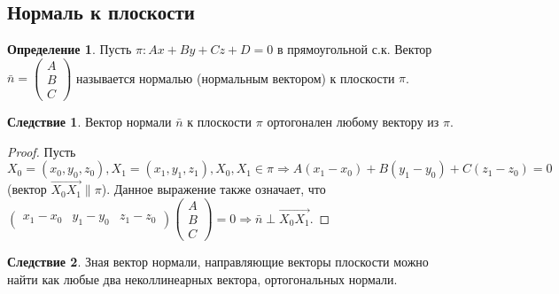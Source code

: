 \documentclass[a4paper, 12pt]{article}
\theoremstyle{definition}
\newtheorem*{definition}{Определение}
\newtheorem*{consequense}{Следствие}
\begin{document}
	\subsection{Нормаль к плоскости}
	\begin{definition}
		Пусть $\pi: Ax + By + Cz + D = 0$ в прямоугольной с.к. Вектор $\bar{n} = \begin{pmatrix} A  \\ B \\ C \end{pmatrix}$ называется нормалью (нормальным вектором) к плоскости $\pi$.
	\end{definition}
	\begin{consequense}
		Вектор нормали $\bar{n}$ к плоскости $\pi$ ортогонален любому вектору из $\pi$.
	\end{consequense}
	\begin{proof}
		Пусть $X_0 = (x_0, y_0, z_0), X_1 = (x_1, y_1, z_1), X_0, X_1 \in \pi \Rightarrow A(x_1-x_0) + B(y_1-y_0) + C(z_1 - z_0) = 0$ (вектор $\overrightarrow{X_0X_1} \parallel \pi$). Данное выражение также означает, что $\begin{pmatrix} x_1-x_0&y_1-y_0&z_1-z_0\end{pmatrix}\begin{pmatrix} A  \\ B \\ C \end{pmatrix} = 0 \Rightarrow \bar{n}\perp\overrightarrow{X_0X_1}$.
	\end{proof}
	\begin{consequense}
		Зная вектор нормали, направляющие векторы плоскости можно найти как любые два неколлинеарных вектора, ортогональных нормали.
	\end{consequense}
\end{document}
